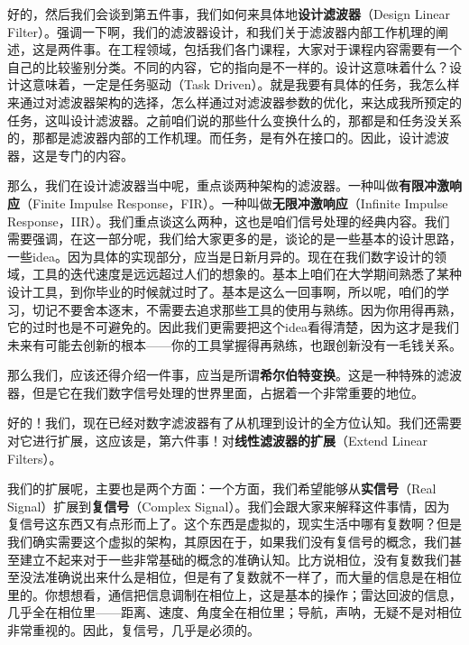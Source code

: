 \documentclass[a4paper,12pt]{article}
\begin{document}
好的，然后我们会谈到第五件事，我们如何来具体地\textbf{设计滤波器}（Design Linear Filter）。强调一下啊，我们的滤波器设计，和我们关于滤波器内部工作机理的阐述，这是两件事。在工程领域，包括我们各门课程，大家对于课程内容需要有一个自己的比较鉴别分类。不同的内容，它的指向是不一样的。设计这意味着什么？设计这意味着，一定是任务驱动（Task Driven）。就是我要有具体的任务，我怎么样来通过对滤波器架构的选择，怎么样通过对滤波器参数的优化，来达成我所预定的任务，这叫设计滤波器。之前咱们说的那些什么变换什么的，那都是和任务没关系的，那都是滤波器内部的工作机理。而任务，是有外在接口的。因此，设计滤波器，这是专门的内容。


那么，我们在设计滤波器当中呢，重点谈两种架构的滤波器。一种叫做\textbf{有限冲激响应}（Finite Impulse Response，FIR）。一种叫做\textbf{无限冲激响应}（Infinite Impulse Response，IIR）。我们重点谈这么两种，这也是咱们信号处理的经典内容。我们需要强调，在这一部分呢，我们给大家更多的是，谈论的是一些基本的设计思路，一些idea。因为具体的实现部分，应当是日新月异的。现在在我们数字设计的领域，工具的迭代速度是远远超过人们的想象的。基本上咱们在大学期间熟悉了某种设计工具，到你毕业的时候就过时了。基本是这么一回事啊，所以呢，咱们的学习，切记不要舍本逐末，不需要去追求那些工具的使用与熟练。因为你用得再熟，它的过时也是不可避免的。因此我们更需要把这个idea看得清楚，因为这才是我们未来有可能去创新的根本——你的工具掌握得再熟练，也跟创新没有一毛钱关系。


那么我们，应该还得介绍一件事，应当是所谓\textbf{希尔伯特变换}。这是一种特殊的滤波器，但是它在我们数字信号处理的世界里面，占据着一个非常重要的地位。


好的！我们，现在已经对数字滤波器有了从机理到设计的全方位认知。我们还需要对它进行扩展，这应该是，第六件事！对\textbf{线性滤波器的扩展}（Extend Linear Filters）。

我们的扩展呢，主要也是两个方面：一个方面，我们希望能够从\textbf{实信号}（Real Signal）扩展到\textbf{复信号}（Complex Signal）。我们会跟大家来解释这件事情，因为复信号这东西又有点形而上了。这个东西是虚拟的，现实生活中哪有复数啊？但是我们确实需要这个虚拟的架构，其原因在于，如果我们没有复信号的概念，我们甚至建立不起来对于一些非常基础的概念的准确认知。比方说相位，没有复数我们甚至没法准确说出来什么是相位，但是有了复数就不一样了，而大量的信息是在相位里的。你想想看，通信把信息调制在相位上，这是基本的操作；雷达回波的信息，几乎全在相位里——距离、速度、角度全在相位里；导航，声呐，无疑不是对相位非常重视的。因此，复信号，几乎是必须的。
\end{document}
